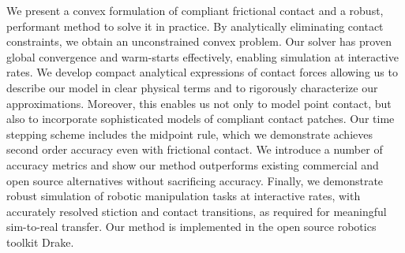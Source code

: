 We present a convex formulation of compliant frictional contact and a robust,
performant method to solve it in practice. By analytically eliminating contact
constraints, we obtain an unconstrained convex problem. Our solver has proven
global convergence and warm-starts effectively, enabling simulation at
interactive rates. We develop compact analytical expressions of contact forces
allowing us to describe our model in clear physical terms and to rigorously
characterize our approximations. Moreover, this enables us not only to model
point contact, but also to incorporate sophisticated models of compliant contact
patches. Our time stepping scheme includes the midpoint rule, which we
demonstrate achieves second order accuracy even with frictional contact. We
introduce a number of accuracy metrics and show our method outperforms existing
commercial and open source alternatives without sacrificing accuracy. Finally,
we demonstrate robust simulation of robotic manipulation tasks at interactive
rates, with accurately resolved stiction and contact transitions, as required
for meaningful sim-to-real transfer. Our method is implemented in the open
source robotics toolkit Drake.
